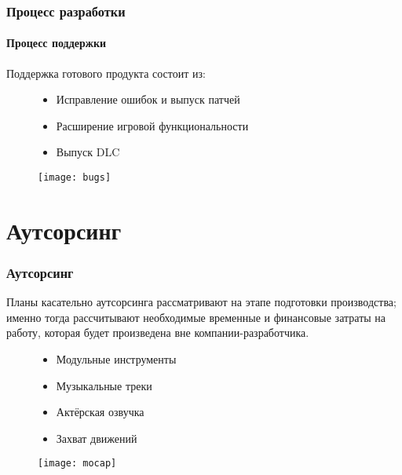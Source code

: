 \begin{frame}
    \frametitle{Процесс разработки}
    \framesubtitle{Процесс поддержки}
    Поддержка готового продукта состоит из:
    \begin{figure}
        \begin{minipage}{0.47\textwidth}
            \begin{itemize}
                \item Исправление ошибок и выпуск патчей
                \item Расширение игровой функциональности
                \item Выпуск DLC
            \end{itemize}
        \end{minipage}
        \begin{minipage}{0.5\textwidth}
            \texttt{[image: bugs]}
        \end{minipage}
    \end{figure}
\end{frame}

\section{Аутсорсинг}
\begin{frame}
    \frametitle{Аутсорсинг}
    Планы касательно аутсорсинга рассматривают на этапе подготовки производства; именно тогда 
    рассчитывают необходимые временные и финансовые затраты на работу, которая будет произведена вне 
    компании-разработчика.
    \begin{figure}
        \begin{minipage}{0.47\textwidth}
            \begin{itemize}
                \item Модульные инструменты
                \item Музыкальные треки
                \item Актёрская озвучка
                \item Захват движений
            \end{itemize}
        \end{minipage}
        \begin{minipage}{0.5\textwidth}
            \texttt{[image: mocap]}
        \end{minipage}
    \end{figure}
\end{frame}